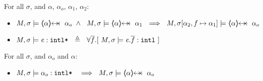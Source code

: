 {
 \begin{lemma} For all $\sigma$,  and $\alpha$, $\alpha_o$, $\alpha_1$, $\alpha_2$:
\begin{itemize}
\item
$ M, \sigma  \models    {\protectedFrom \alpha  {\alpha_o}}  \  \wedge \ \  M, \sigma  \models    {\protectedFrom \alpha  {\alpha_1}}    \   \ 
\Longrightarrow\ \ M, \sigma[\alpha_2,f \mapsto \alpha_1] \models  \protectedFrom\alpha   {\alpha_o}$
\end{itemize}
\end{lemma}
}

{
\begin{definition}
\begin{itemize}
\item
$M, \sigma \models \mathit{e}:\mbox{\normalfont{\texttt{intl*}}} \ \ \triangleq \ \ \forall \overline{f}.[\  M, \sigma \models \mathit{e}.\overline{f}:\mbox{\normalfont{\texttt{intl}}}\ ]$
\end{itemize}
\end{definition}
}

{
 \begin{lemma} For all $\sigma$, and $\alpha_o$ and $\alpha$:
\begin{itemize}
\item
$M, \sigma \models \internalPaths{\alpha_o}  \    \ \ \Longrightarrow\ \ M, \sigma \models {\protectedFrom \alpha {\alpha_o}}$
\end{itemize}
\end{lemma}
}

